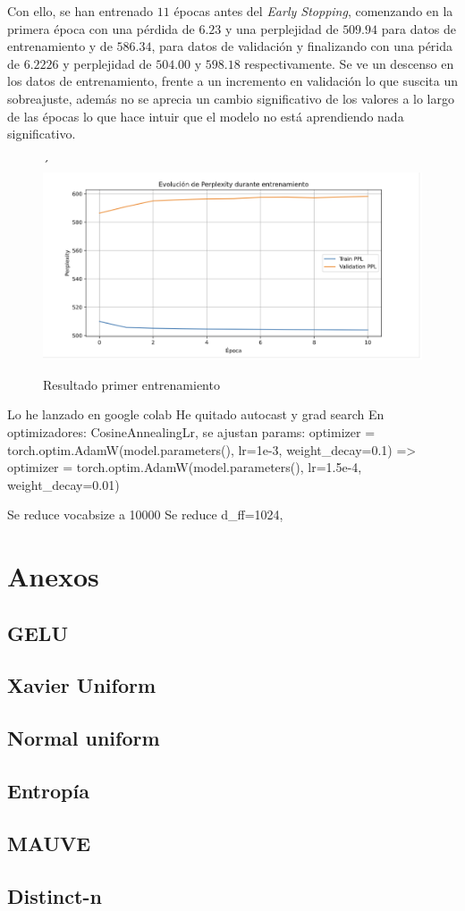 \documentclass[11pt]{book}
\newcommand{\clearemptydoublepage}{\newpage{\pagestyle{empty}\cleardoublepage}}
\theoremstyle{plain}
\theoremstyle{definition}
\begin{document}
Con ello, se han entrenado $11$ épocas antes del \textit{Early Stopping}, comenzando en la primera época con una pérdida de $6.23$ y una perplejidad de  $509.94$ para datos de entrenamiento y de $586.34$, para datos de validación y finalizando con una périda de $6.2226$ y perplejidad de $504.00$ y $598.18$ respectivamente. Se ve un descenso en los datos de entrenamiento, frente a un incremento en validación lo que suscita un sobreajuste, además no se aprecia un cambio significativo de los valores a lo largo de las épocas lo que hace intuir que el modelo no está aprendiendo nada significativo.

\begin{figure}[h]
    \centering´
    \includegraphics[width=0.5\linewidth]{img/resultado_entrenamiento_v1.png}
    \caption{Resultado primer entrenamiento}
    \label{fig:placeholder23}
\end{figure}

Lo he lanzado en google colab
He quitado autocast y grad search
En optimizadores: CosineAnnealingLr, se ajustan params: optimizer = torch.optim.AdamW(model.parameters(), lr=1e-3, weight_decay=0.1)
 => optimizer = torch.optim.AdamW(model.parameters(), lr=1.5e-4, weight_decay=0.01)

Se reduce vocabsize a 10000
Se reduce   d_ff=1024,


\clearemptydoublepage

\printbibliography[title={Referencias Bibliográficas}]

\appendix 
\chapter{Anexos}

\section{GELU} \label{sec:gelu}
\section{Xavier Uniform} \label{sec:xavier}
\section{Normal uniform} \label{sec:normal}

\section{Entropía} \label{sec:entropia}

\section{MAUVE} \label{sec:mauve}


\section{Distinct-n} \label{sec:distinct-n}


\clearemptydoublepage
\end{document}
